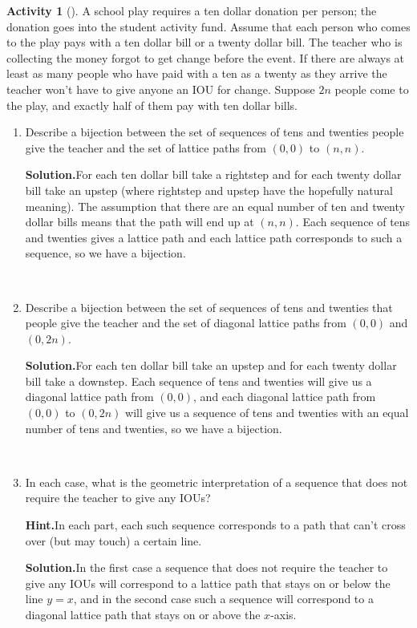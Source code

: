 \documentclass[10pt,]{book}
\theoremstyle{plain}
\theoremstyle{definition}
\newtheorem{activity}[project]{Activity}
\numberwithin{equation}{chapter}
\begin{document}
\begin{activity}[]\label{activity-50}
A school play requires a ten dollar donation per person; the donation goes into the student activity fund. Assume that each person who comes to the play pays with a ten dollar bill or a twenty dollar bill. The teacher who is collecting the money forgot to get change before the event. If there are always at least as many people who have paid with a ten as a twenty as they arrive the teacher won't have to give anyone an IOU for change. Suppose \(2n\) people come to the play, and exactly half of them pay with ten dollar bills.%
~\par
\begin{enumerate}[label=(\alph*)]
 \item Describe a bijection between the set of sequences of tens and twenties people give the teacher and the set of lattice paths from \((0,0)\) to \((n,n)\).%
\par\medskip\noindent%
\textbf{Solution.}\quad For each ten dollar bill take a rightstep and for each twenty dollar bill take an upstep (where rightstep and upstep have the hopefully natural meaning). The assumption that there are an equal number of ten and twenty dollar bills means that the path will end up at \((n,n)\). Each sequence of tens and twenties gives a lattice path and each lattice path corresponds to such a sequence, so we have a bijection.%

~\par
\item Describe a bijection between the set of sequences of tens and twenties that people give the teacher and the set of diagonal lattice paths from \((0,0)\) and \((0,2n)\).%
\par\medskip\noindent%
\textbf{Solution.}\quad For each ten dollar bill take an upstep and for each twenty dollar bill take a downstep. Each sequence of tens and twenties will give us a diagonal lattice path from \((0,0)\), and each diagonal lattice path from\((0,0)\) to \((0,2n)\) will give us a sequence of tens and twenties with an equal number of tens and twenties, so we have a bijection.%

~\par
\item In each case, what is the geometric interpretation of a sequence that does not require the teacher to give any IOUs?%
\par\medskip\noindent%
\textbf{Hint.}\quad In each part, each such sequence corresponds to a path that can’t cross over (but may touch) a certain line.%
\par\medskip\noindent%
\textbf{Solution.}\quad In the first case a sequence that does not require the teacher to give any IOUs will correspond to a lattice path that stays on or below the line \(y=x\), and in the second case such a sequence will correspond to a diagonal lattice path that stays on or above the \(x\)-axis.%

\end{enumerate}
\end{activity}
\end{document}
